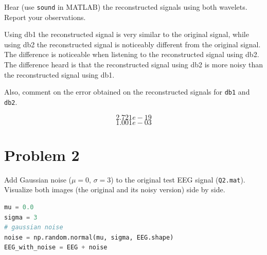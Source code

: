 
\begin{tcolorbox}[colback=red!5!white,colframe=red!75!black,title=Problem 1.c]
    Hear (use \verb|sound| in MATLAB) the reconstructed signals using both wavelets.
    Report your observations.
\end{tcolorbox}

Using db1 the reconstructed signal is very similar to the original signal, while using db2 the reconstructed signal is noticeably different from the original signal. The difference is noticeable when listening to the reconstructed signal using db2. The difference heard is that the reconstructed signal using db2 is more noisy than the reconstructed signal using db1. 



\begin{tcolorbox}[colback=red!5!white,colframe=red!75!black,title=Problem 1.d]
    Also, comment on the error obtained on the reconstructed signals for \verb|db1| and \verb|db2|.
\end{tcolorbox}



$$2.721e-19$$ %
$$1.001e-03$$ %





\section*{Problem 2} \label{sec:problem2}

\begin{tcolorbox}[colback=green!5!white,boxrule=0pt,frame empty]
    Add Gaussian noise ($\mu = 0$, $\sigma = 3$) to the original test
    EEG signal (\verb|Q2.mat|).
    Visualize both images (the original and its noisy version) side by side.
\end{tcolorbox}


\begin{lstlisting}[language=Python]
mu = 0.0
sigma = 3
# gaussian noise
noise = np.random.normal(mu, sigma, EEG.shape)
EEG_with_noise = EEG + noise
\end{lstlisting}


